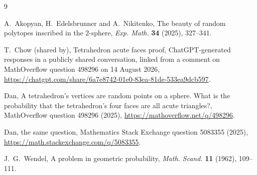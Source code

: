 \documentclass[11pt,a4paper]{article}
\begin{document}
\begin{thebibliography}{9}
\small\raggedright
{} A.~Akopyan, H.~Edelsbrunner and A.~Nikitenko, The beauty of
random polytopes inscribed in the $2$-sphere, \emph{Exp. Math.} \textbf{34}
(2025), 327--341.

 T.~Chow (shared by), Tetrahedron acute faces proof,
ChatGPT-generated responses in a publicly shared conversation, linked from
a comment on MathOverflow question 498296 on 14 August 2026,
\url{https://chatgpt.com/share/6a7e8742-01e0-83ea-81de-533ea9dcb597}.

 Dan, A tetrahedron's vertices are random points on a sphere.
What is the probability that the tetrahedron's four faces are all acute
triangles?, MathOverflow question 498296 (2025),
\url{https://mathoverflow.net/q/498296}.

 Dan, the same question, Mathematics Stack Exchange question
5083355 (2025), \url{https://math.stackexchange.com/q/5083355}.

 J.~G.~Wendel, A problem in geometric probability,
\emph{Math. Scand.} \textbf{11} (1962), 109--111.
\end{thebibliography}
\end{document}

